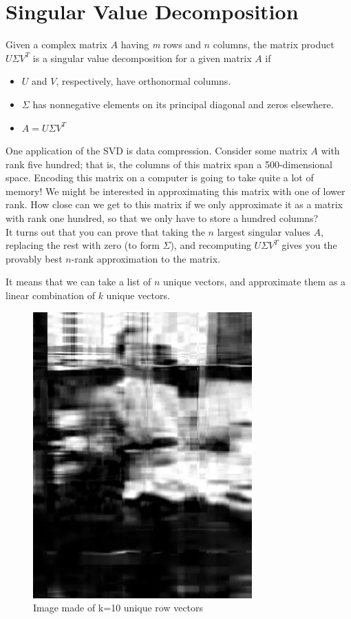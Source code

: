 \chapter{Singular Value Decomposition}

Given a complex matrix $ A $ having \textit{m} rows and $ n $ columns, the matrix product $ U\Sigma V^T $ is a singular value
decomposition for a given matrix $ A $ if
\begin{itemize}
\item $ U $ and $ V $, respectively, have orthonormal columns. 
\item $\Sigma$  has nonnegative elements on its principal diagonal and zeros elsewhere.
\item $ A=U\Sigma V^T $
\end{itemize}
One application of the SVD is data compression. Consider some matrix $ A $ with rank five hundred; that is, the columns of this matrix span a 500-dimensional space. Encoding this matrix on a computer is going to take quite a lot of memory! We might be interested in approximating this matrix with one of lower rank. How close can we get to this matrix if we only approximate it as a matrix with rank one hundred, so that we only have to store a hundred columns?\\
It turns out that you can prove that taking the $ n $ largest singular values $ A $, replacing the rest with zero (to form $ \Sigma $), and recomputing $U\Sigma V^T $ gives you the provably best $ n $-rank approximation to the matrix. \cite{svdintro}


It means that we can take a list of $ n $ unique vectors, and approximate them as a linear combination of $ k $ unique vectors.\cite{svdquora}


  
    \begin{figure}[h!]
    	\centering
    	\includegraphics[width=0.75\textwidth]{imm/svd/10vectors.png} 	\caption{Image made of k=10 unique row vectors
    	} 
    	\label{k10}
    \end{figure}
    
